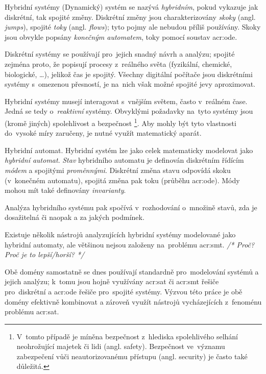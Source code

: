 \documentclass[thesis=M,czech]{FITthesis}[2012/06/26]
\newcommand{\acrlabel}[1]{acr:#1}
\newcommand{\acr}[1]{\acrshort{\acrlabel{#1}}}
\newcommand{\cmt}[1]{\textit{/* #1 */}}
\newcommand{\hl}[1]{\textit{#1}}
\newcommand{\name}[1]{\hl{#1}}
\begin{document}

\begin{section}{Hybridní systémy}\label{s:theory:hybrid}
(Dynamický) systém se nazývá \name{hybridním},
pokud vykazuje jak diskrétní, tak spojité změny.
Diskrétní změny jsou charakterizovány \name{skoky} (angl. \name{jumps}),
spojité \name{toky} (angl. \name{flows});
tyto pojmy ale nebudou příliš používány.
Skoky jsou obvykle popsány \name{konečným automatem},
toky pomocí soustav \acr{ode}.

Diskrétní systémy se používají pro~jejich snadný návrh a analýzu;
spojité zejména proto, že popisují procesy z~reálného světa
(fyzikální, chemické, biologické, \dots),
jelikož čas je spojitý.
Všechny digitální počítače jsou diskrétními systémy
s~omezenou přesností,
je na~nich však možné spojité jevy aproximovat.

Hybridní systémy musejí interagovat s~vnějším světem,
často v~reálném čase.
Jedná se tedy o~\name{reaktivní} systémy.
Obvyklými požadavky na~tyto systémy
jsou (kromě jiných) spolehlivost a bezpečnost%
\footnote{V~tomto případě je míněna
bezpečnost z~hlediska spolehlivého selhání
neohrožující majetek či lidi (angl. safety).
Bezpečnost ve~významu zabezpečení
vůči neautorizovanému přístupu (angl. security)
je často také důležitá.}.
Aby mohly být tyto vlastnosti do~vysoké míry zaručeny,
je nutné využít matematický aparát.


\begin{paragraph}{Hybridní automat.}\label{s:theory:hybrid:auto}
Hybridní systém lze jako celek
matematicky modelovat jako \name{hybridní automat}.
\name{Stav} hybridního automatu
je definován diskrétním řídícím \name{módem}
a spojitými \name{proměnnými}.
Diskrétní změna stavu odpovídá skoku
(v~konečném automatu),
spojitá změna pak toku
(průběhu \acr{ode}).
Módy mohou mít také definovány \name{invarianty}.

Analýza hybridního systému pak spočívá
v~rozhodování o~množině stavů,
zda je dosažitelná či naopak
a za jakých podmínek.

Existuje několik nástrojů
analyzujících hybridní systémy
modelované jako hybridní automaty,
ale většinou nejsou založeny
na~problému \acr{smt}.
\cmt{Proč? Proč je to lepší/horší?}
\end{paragraph} %


\bigskip

Obě domény samostatně se dnes
používají standardně pro~modelování systémů
a jejich analýzu;
k~tomu jsou hojně využívány
\acr{sat} či \acr{smt} řešiče pro~diskrétní
a \acr{ode} řešiče pro~spojité systémy.
Výzvou této práce je obě domény efektivně kombinovat
a zároveň využít nástrojů
vycházejících z~fenoménu problému \acr{sat}.
\end{section} %
\end{document}

